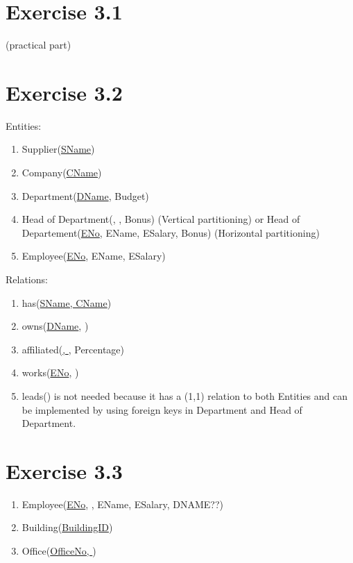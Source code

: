 \documentclass{article} %
\newcommand{\homeworkNumber}{3}
\begin{document}
\section*{Exercise \homeworkNumber.1}

(practical part)

\section*{Exercise \homeworkNumber.2}

\noindent
Entities:
\begin{enumerate}[-]
\item Supplier(\underline{SName})
\item Company(\underline{CName})
\item Department(\underline{DName},  Budget)
\item Head of Department(\underline{}, , Bonus) (Vertical partitioning) or Head of Departement(\underline{ENo}, EName, ESalary, Bonus) (Horizontal partitioning)
\item Employee(\underline{ENo}, EName, ESalary)
\end{enumerate}

\noindent
Relations:
\begin{enumerate}[-]
\item has(\underline{SName, CName})
\item owns(\underline{DName}, )
\item affiliated(\underline{, }, Percentage)
\item works(\underline{ENo}, )
\item leads() is not needed because it has a (1,1) relation to both Entities and can be implemented by using foreign keys in Department and Head of Department.

\end{enumerate}

\section*{Exercise \homeworkNumber.3}

\begin{enumerate}[-]
\item Employee(\underline{ENo}, , EName, ESalary, DNAME??)

\item Building(\underline{BuildingID})
\item Office(\underline{OfficeNo, })
\end{enumerate}
\end{document}
